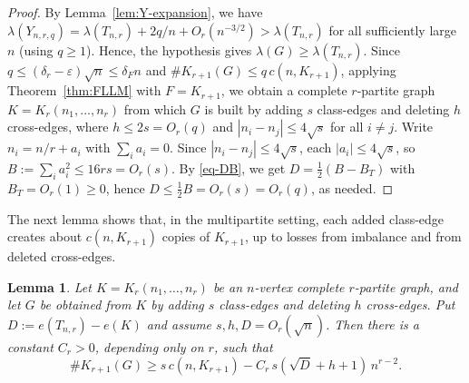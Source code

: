 \documentclass[11pt,a4paper]{article}
\newtheorem{lemma}[theorem]{Lemma}
\theoremstyle{definition}
\theoremstyle{plain}
\renewcommand{\le}{\leqslant}
\renewcommand{\ge}{\geqslant}
\begin{document}
\begin{proof}
By Lemma~\ref{lem:Y-expansion}, we have 
$\lambda(Y_{n,r,q})=\lambda(T_{n,r})+2q/n
+O_r(n^{-3/2})>\lambda(T_{n,r})$
for all sufficiently large $n$ (using $q\ge1$). Hence, 
the hypothesis gives $\lambda(G)\ge\lambda(T_{n,r})$. 
Since $q\le(\delta_r-\varepsilon)\sqrt n\le\delta_F n$ and $\texttt{\#} K_{r+1}(G)\le q\, c(n,K_{r+1})$,  
applying Theorem~\ref{thm:FLLM} with $F=K_{r+1}$, we obtain a complete 
$r$-partite graph $K=K_r(n_1,\ldots,n_r)$ from which $G$ is built by adding
$s$ class-edges and deleting $h$ cross-edges, where $ h\le 2s = O_r(q)$ and 
$ |n_i-n_j|\le 4\sqrt s $ for all $i\neq j$.  
Write $n_i=n/r+a_i$ with $\sum_i a_i=0$. Since $|n_i-n_j|\le 4\sqrt s$, each $|a_i|\le 4\sqrt s$, so
$B:=\sum_i a_i^2\le 16rs=O_r(s)$. 
By \eqref{eq-DB}, we get 
$D=\tfrac12(B-B_T)$ with $B_T=O_r(1)\ge 0$, hence
$    D\le\tfrac12 B=O_r(s)=O_r(q)$, as needed. 
\end{proof}


The next lemma shows that, in the multipartite setting, each added class-edge
creates about $c(n,K_{r+1})$ copies of $K_{r+1}$, up to losses from imbalance and from
deleted cross-edges.

\begin{lemma}
\label{lem:local-counting}
Let $K=K_r(n_1,\ldots,n_r)$ be an $n$-vertex complete $r$-partite graph, and let $G$ be
obtained from $K$ by adding $s$ class-edges and deleting $h$ cross-edges. Put
$D:=e(T_{n,r})-e(K)$ and assume $s,h,D=O_r(\sqrt n)$. Then there is a constant $C_r>0$,
depending only on $r$, such that
\begin{equation*}
        \texttt{\#} K_{r+1}(G)\ge s\,c(n,K_{r+1})-C_r\,s(\sqrt D+h+1)\,n^{r-2}. 
\end{equation*}
\end{lemma} 
\end{document}
